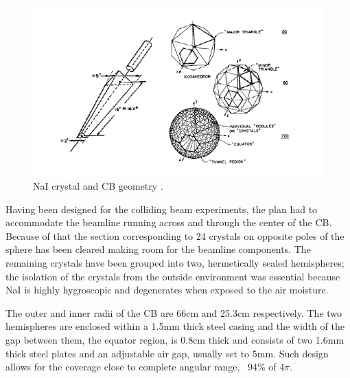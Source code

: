 \begin{figure}[H]
\begin{center}
\includegraphics[scale=0.7]{naigeom.png}
\caption{NaI crystal and CB geometry \cite{a2mami}.}
\label{naigeom}
\end{center}
\end{figure}

\indent Having  been  designed  for  the  colliding  beam  experiments,  the  plan  had  to accommodate  the  beamline  running  across  and  through the  center  of  the  CB. Because of that the section corresponding to 24 crystals on opposite poles of the sphere  has  been  cleared  making  room  for  the  beamline  components.  The remaining crystals have been grouped into two, hermetically sealed hemispheres; the isolation of the crystals from the outside environment was essential because NaI is highly hygroscopic and degenerates when exposed to the air moisture.

\indent The outer and inner radii of the CB are 66cm and 25.3cm respectively. The two hemispheres are enclosed within a 1.5mm thick steel casing and the width of the gap between them, the equator region, is 0.8cm thick and consists of two 1.6mm thick steel plates and an adjustable air gap, usually set to 5mm. Such design allows for the coverage close to complete angular range, ~94\% of 4$\pi$.


